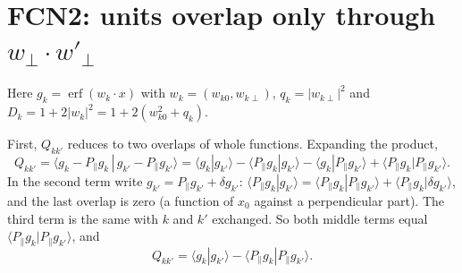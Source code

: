 \documentclass[11pt,a4paper]{article}
\newcommand{\erf}{\operatorname{erf}}
\begin{document}
\section*{FCN2: units overlap only through $w_\perp\cdot w'_\perp$}

Here $g_k=\erf(w_k\cdot x)$ with $w_k=(w_{k0},w_{k\perp})$, $q_k=|w_{k\perp}|^2$ and $D_k=1+2|w_k|^2=1+2(w_{k0}^2+q_k)$.

First, $Q_{kk'}$ reduces to two overlaps of whole functions. Expanding the product,
\begin{equation*}
  Q_{kk'}=\langle g_k-P_\parallel g_k\,|\,g_{k'}-P_\parallel g_{k'}\rangle
  =\langle g_k|g_{k'}\rangle-\langle P_\parallel g_k|g_{k'}\rangle-\langle g_k|P_\parallel g_{k'}\rangle
  +\langle P_\parallel g_k|P_\parallel g_{k'}\rangle .
\end{equation*}
In the second term write $g_{k'}=P_\parallel g_{k'}+\delta g_{k'}$:
$\langle P_\parallel g_k|g_{k'}\rangle=\langle P_\parallel g_k|P_\parallel g_{k'}\rangle+\langle P_\parallel g_k|\delta g_{k'}\rangle$,
and the last overlap is zero (a function of $x_0$ against a perpendicular part). The third term is the same with $k$
and $k'$ exchanged. So both middle terms equal $\langle P_\parallel g_k|P_\parallel g_{k'}\rangle$, and
\begin{equation*}
  Q_{kk'}=\langle g_k|g_{k'}\rangle-\langle P_\parallel g_k|P_\parallel g_{k'}\rangle .
\end{equation*}
\end{document}
